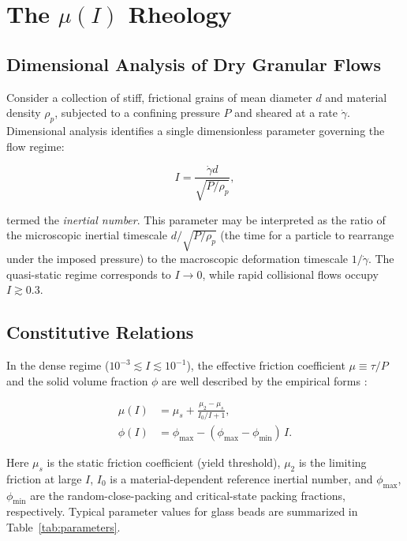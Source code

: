 \section{The $\mu(I)$ Rheology}

\subsection{Dimensional Analysis of Dry Granular Flows}

Consider a collection of stiff, frictional grains of mean diameter $d$ and material density $\rho_p$, subjected to a confining pressure $P$ and sheared at a rate $\dot{\gamma}$. Dimensional analysis \cite{miidi2004,daCruz2005} identifies a single dimensionless parameter governing the flow regime:

\begin{equation}\label{eq:inertial}
I = \frac{\dot{\gamma} d}{\sqrt{P / \rho_p}},
\end{equation}

termed the \textit{inertial number}. This parameter may be interpreted as the ratio of the microscopic inertial timescale $d/\sqrt{P/\rho_p}$ (the time for a particle to rearrange under the imposed pressure) to the macroscopic deformation timescale $1/\dot{\gamma}$. The quasi-static regime corresponds to $I \to 0$, while rapid collisional flows occupy $I \gtrsim 0.3$.

\subsection{Constitutive Relations}

In the dense regime ($10^{-3} \lesssim I \lesssim 10^{-1}$), the effective friction coefficient $\mu \equiv \tau / P$ and the solid volume fraction $\phi$ are well described by the empirical forms \cite{Jop2006}:

\begin{align}
\mu(I) &= \mu_s + \frac{\mu_2 - \mu_s}{I_0/I + 1}, \label{eq:muI}\\
\phi(I) &= \phi_{\max} - (\phi_{\max} - \phi_{\min})\, I. \label{eq:phiI}
\end{align}

Here $\mu_s$ is the static friction coefficient (yield threshold), $\mu_2$ is the limiting friction at large $I$, $I_0$ is a material-dependent reference inertial number, and $\phi_{\max}$, $\phi_{\min}$ are the random-close-packing and critical-state packing fractions, respectively. Typical parameter values for glass beads are summarized in Table~\ref{tab:parameters}.

